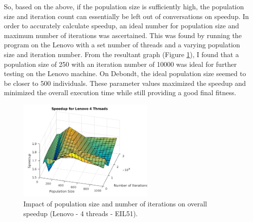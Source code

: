 \documentclass[10pt,letterpaper]{article}
\begin{document}
So, based on the above, if the population size is sufficiently high, the population size and iteration count can essentially be left out of conversations on speedup. In order to accurately calculate speedup, an ideal number for population size and maximum number of iterations was ascertained. This was found by running the program on the Lenovo with a set number of threads and a varying population size and iteration number. From the resultant graph (Figure
\ref{fig:popvsiter}), I found that a population size of 250 with an iteration number of 10000 was ideal for further testing on the Lenovo machine. On Debondt, the ideal population size seemed to be closer to 500 individuals. These parameter values maximized the speedup and minimized the overall execution time while still providing a good final fitness.

\begin{figure}
\centering
\includegraphics[width=0.6\textwidth]{../img/Lenovo_4Thread_PopvsIter.png}
\caption{Impact of population size and number of iterations on overall speedup (Lenovo - 4 threads - EIL51).}
\label{fig:popvsiter}
\end{figure}


\end{document}
